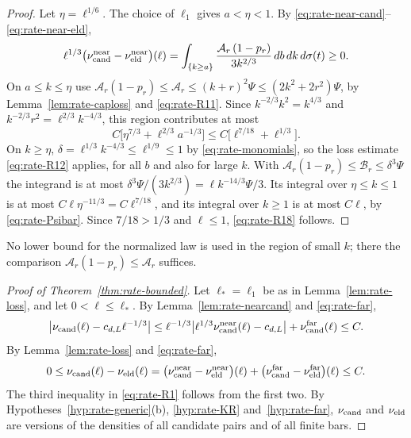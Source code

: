 \begin{proof}
Let $\eta=\ell^{1/6}$. The choice of $\ell_1$ gives $a<\eta<1$. By \eqref{eq:rate-near-cand}--\eqref{eq:rate-near-eld},
\[
\ell^{1/3}\bigl(\nu^{\rm near}_{\mathrm{cand}}-\nu^{\rm near}_{\mathrm{eld}}\bigr)(\ell)=\int_{\{k\ge a\}}\frac{\mathcal A_r\,(1-p_r)}{3k^{2/3}}\,db\,dk\,d\sigma(t)\ge0 .
\]
On $a\le k\le\eta$ use $\mathcal A_r(1-p_r)\le\mathcal A_r\le(k+r)^2\Psi\le(2k^2+2r^2)\Psi$, by Lemma~\ref{lem:rate-caploss} and \eqref{eq:rate-R11}. Since $k^{-2/3}k^2=k^{4/3}$ and $k^{-2/3}r^2=\ell^{2/3}k^{-4/3}$, this region contributes at most
\begin{equation}\label{eq:rate-R17}
C\bigl[\eta^{7/3}+\ell^{2/3}a^{-1/3}\bigr]\le C\bigl[\ell^{7/18}+\ell^{1/3}\bigr].
\end{equation}
On $k\ge\eta$, $\delta=\ell^{1/3}k^{-4/3}\le\ell^{1/9}\le1$ by \eqref{eq:rate-monomials}, so the loss estimate \eqref{eq:rate-R12} applies, for all $b$ and also for large $k$. With $\mathcal A_r(1-p_r)\le\mathcal B_r\le\delta^3\Psi$ the integrand is at most $\delta^3\Psi/(3k^{2/3})=\ell k^{-14/3}\Psi/3$. Its integral over $\eta\le k\le1$ is at most $C\ell\eta^{-11/3}=C\ell^{7/18}$, and its integral over $k\ge1$ is at most $C\ell$, by \eqref{eq:rate-Psibar}. Since $7/18>1/3$ and $\ell\le1$, \eqref{eq:rate-R18} follows.
\end{proof}

No lower bound for the normalized law is used in the region of small $k$; there the comparison $\mathcal A_r(1-p_r)\le\mathcal A_r$ suffices.

\begin{proof}[Proof of Theorem~\ref{thm:rate-bounded}]
Let $\ell_*=\ell_1$ be as in Lemma~\ref{lem:rate-loss}, and let $0<\ell\le\ell_*$. By Lemma~\ref{lem:rate-nearcand} and \eqref{eq:rate-far},
\[
\bigl|\nu_{\mathrm{cand}}(\ell)-c_{d,L}\ell^{-1/3}\bigr|\le\ell^{-1/3}\bigl|\ell^{1/3}\nu^{\rm near}_{\mathrm{cand}}(\ell)-c_{d,L}\bigr|+\nu^{\rm far}_{\mathrm{cand}}(\ell)\le C .
\]
By Lemma~\ref{lem:rate-loss} and \eqref{eq:rate-far},
\[
0\le\nu_{\mathrm{cand}}(\ell)-\nu_{\mathrm{eld}}(\ell)=\bigl(\nu^{\rm near}_{\mathrm{cand}}-\nu^{\rm near}_{\mathrm{eld}}\bigr)(\ell)+\bigl(\nu^{\rm far}_{\mathrm{cand}}-\nu^{\rm far}_{\mathrm{eld}}\bigr)(\ell)\le C .
\]
The third inequality in \eqref{eq:rate-R1} follows from the first two. By Hypotheses~\ref{hyp:rate-generic}(b), \ref{hyp:rate-KR} and~\ref{hyp:rate-far}, $\nu_{\mathrm{cand}}$ and $\nu_{\mathrm{eld}}$ are versions of the densities of all candidate pairs and of all finite bars.
\end{proof}

